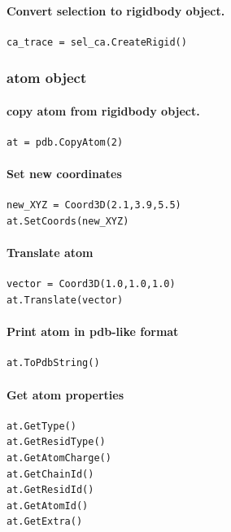 \documentclass[12pt,a4paper]{article}
\begin{document}
\paragraph{Convert selection to rigidbody object.}
\begin{verbatim}
ca_trace = sel_ca.CreateRigid()
\end{verbatim}

\subsubsection{atom object}

\paragraph{copy atom from rigidbody object.}
\begin{verbatim}
at = pdb.CopyAtom(2)
\end{verbatim}

\paragraph{Set new coordinates}
\begin{verbatim}
new_XYZ = Coord3D(2.1,3.9,5.5)
at.SetCoords(new_XYZ)
\end{verbatim}

\paragraph{Translate atom}
\begin{verbatim}
vector = Coord3D(1.0,1.0,1.0)
at.Translate(vector)
\end{verbatim}


\paragraph{Print atom in pdb-like format}
\begin{verbatim}
at.ToPdbString()
\end{verbatim}

\paragraph{Get atom properties}
\begin{verbatim}
at.GetType()
at.GetResidType()
at.GetAtomCharge()
at.GetChainId()
at.GetResidId()
at.GetAtomId()
at.GetExtra()
\end{verbatim}
\end{document}
